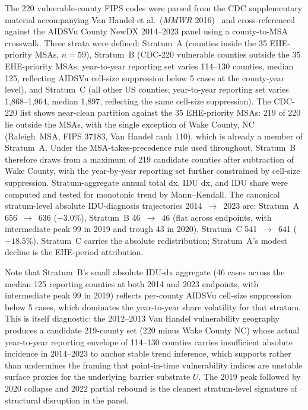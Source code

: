\documentclass[11pt]{article}
\begin{document}
The 220 vulnerable-county FIPS codes were parsed from the CDC supplementary material accompanying Van Handel et al.\ (\emph{MMWR} 2016)~\cite{vanhandel2016} and cross-referenced against the AIDSVu County NewDX 2014--2023 panel using a county-to-MSA crosswalk. Three strata were defined: Stratum~A (counties inside the 35 EHE-priority MSAs, $n = 59$), Stratum~B (CDC-220 vulnerable counties outside the 35 EHE-priority MSAs; year-to-year reporting set varies 114--130 counties, median 125, reflecting AIDSVu cell-size suppression below 5 cases at the county-year level), and Stratum~C (all other US counties; year-to-year reporting set varies 1{,}868--1{,}964, median 1{,}897, reflecting the same cell-size suppression). The CDC-220 list shows near-clean partition against the 35 EHE-priority MSAs: 219 of 220 lie outside the MSAs, with the single exception of Wake County, NC (Raleigh~MSA, FIPS 37183, Van Handel rank 110), which is already a member of Stratum~A. Under the MSA-takes-precedence rule used throughout, Stratum~B therefore draws from a maximum of 219 candidate counties after subtraction of Wake County, with the year-by-year reporting set further constrained by cell-size suppression. Stratum-aggregate annual total dx, IDU dx, and IDU share were computed and tested for monotonic trend by Mann--Kendall. The canonical stratum-level absolute IDU-diagnosis trajectories 2014~$\to$~2023 are: Stratum~A 656~$\to$~636 ($-3.0\%$), Stratum~B 46~$\to$~46 (flat across endpoints, with intermediate peak 99 in 2019 and trough 43 in 2020), Stratum~C 541~$\to$~641 ($+18.5\%$). Stratum~C carries the absolute redistribution; Stratum~A's modest decline is the EHE-period attribution.

Note that Stratum~B's small absolute IDU-dx aggregate (46 cases across the median 125 reporting counties at both 2014 and 2023 endpoints, with intermediate peak 99 in 2019) reflects per-county AIDSVu cell-size suppression below 5 cases, which dominates the year-to-year share volatility for that stratum. This is itself diagnostic: the 2012--2013 Van Handel vulnerability geography produces a candidate 219-county set (220 minus Wake County NC) whose actual year-to-year reporting envelope of 114--130 counties carries insufficient absolute incidence in 2014--2023 to anchor stable trend inference, which supports rather than undermines the framing that point-in-time vulnerability indices are unstable surface proxies for the underlying barrier substrate $U$. The 2019 peak followed by 2020 collapse and 2022 partial rebound is the cleanest stratum-level signature of structural disruption in the panel.
\end{document}
